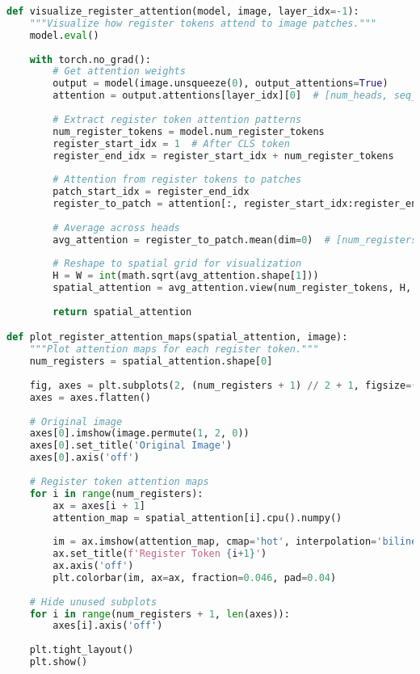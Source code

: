 \begin{lstlisting}[language=Python, caption=Analyzing register token attention patterns]
def visualize_register_attention(model, image, layer_idx=-1):
    """Visualize how register tokens attend to image patches."""
    model.eval()
    
    with torch.no_grad():
        # Get attention weights
        output = model(image.unsqueeze(0), output_attentions=True)
        attention = output.attentions[layer_idx][0]  # [num_heads, seq_len, seq_len]
        
        # Extract register token attention patterns
        num_register_tokens = model.num_register_tokens
        register_start_idx = 1  # After CLS token
        register_end_idx = register_start_idx + num_register_tokens
        
        # Attention from register tokens to patches
        patch_start_idx = register_end_idx
        register_to_patch = attention[:, register_start_idx:register_end_idx, patch_start_idx:]
        
        # Average across heads
        avg_attention = register_to_patch.mean(dim=0)  # [num_registers, num_patches]
        
        # Reshape to spatial grid for visualization
        H = W = int(math.sqrt(avg_attention.shape[1]))
        spatial_attention = avg_attention.view(num_register_tokens, H, W)
        
        return spatial_attention

def plot_register_attention_maps(spatial_attention, image):
    """Plot attention maps for each register token."""
    num_registers = spatial_attention.shape[0]
    
    fig, axes = plt.subplots(2, (num_registers + 1) // 2 + 1, figsize=(15, 8))
    axes = axes.flatten()
    
    # Original image
    axes[0].imshow(image.permute(1, 2, 0))
    axes[0].set_title('Original Image')
    axes[0].axis('off')
    
    # Register token attention maps
    for i in range(num_registers):
        ax = axes[i + 1]
        attention_map = spatial_attention[i].cpu().numpy()
        
        im = ax.imshow(attention_map, cmap='hot', interpolation='bilinear')
        ax.set_title(f'Register Token {i+1}')
        ax.axis('off')
        plt.colorbar(im, ax=ax, fraction=0.046, pad=0.04)
    
    # Hide unused subplots
    for i in range(num_registers + 1, len(axes)):
        axes[i].axis('off')
    
    plt.tight_layout()
    plt.show()
\end{lstlisting}

